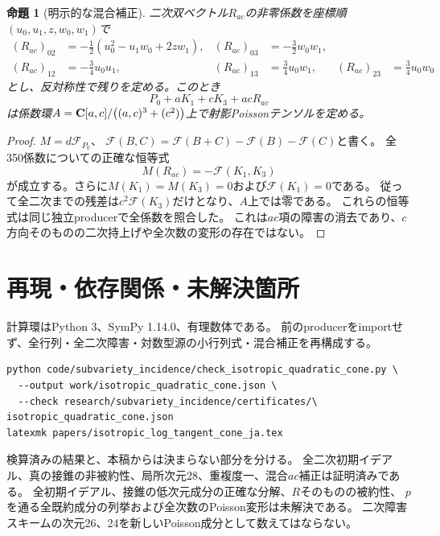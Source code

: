 \documentclass[a4paper,11pt]{ltjsarticle}
\newtheorem{proposition}[theorem]{命題}
\theoremstyle{remark}\newtheorem{remark}[theorem]{注意}
\begin{document}
\begin{proposition}[明示的な混合補正]\label{prop:mixed}
二次双ベクトル$R_{ac}$の非零係数を座標順$(u_0,u_1,z,w_0,w_1)$で
\[
\begin{aligned}
 (R_{ac})_{02}&=-\tfrac12(u_0^2-u_1w_0+2zw_1),&
 (R_{ac})_{03}&=-\tfrac32w_0w_1,\\
 (R_{ac})_{12}&=-\tfrac34u_0u_1,&
 (R_{ac})_{13}&=\tfrac34u_0w_1,&
 (R_{ac})_{23}&=\tfrac34u_0w_0
\end{aligned}
\]
とし、反対称性で残りを定める。このとき
\[
 P_0+aK_1+cK_3+acR_{ac}
\]
は係数環$A=\mathbf C[a,c]/\bigl((a,c)^3+(c^2)\bigr)$上で射影Poissonテンソルを定める。
\end{proposition}
\begin{proof}
$M=d\mathcal F_{P_0}$、
$\mathcal F(B,C)=\mathcal F(B+C)-\mathcal F(B)-\mathcal F(C)$と書く。
全350係数についての正確な恒等式
\[
 M(R_{ac})=-\mathcal F(K_1,K_3)
\]
が成立する。さらに$M(K_1)=M(K_3)=0$および$\mathcal F(K_1)=0$である。
従って全二次までの残差は$c^2\mathcal F(K_3)$だけとなり、$A$上では零である。
これらの恒等式は同じ独立producerで全係数を照合した。
これは$ac$項の障害の消去であり、$c$方向そのものの二次持上げや全次数の変形の存在ではない。
\end{proof}

\section{再現・依存関係・未解決箇所}
計算環はPython 3、SymPy 1.14.0、有理数体である。
前のproducerをimportせず、全行列・全二次障害・対数型源の小行列式・混合補正を再構成する。
\begin{verbatim}
python code/subvariety_incidence/check_isotropic_quadratic_cone.py \
  --output work/isotropic_quadratic_cone.json \
  --check research/subvariety_incidence/certificates/\
isotropic_quadratic_cone.json
latexmk papers/isotropic_log_tangent_cone_ja.tex
\end{verbatim}
検算済みの結果と、本稿からは決まらない部分を分ける。
全二次初期イデアル、真の接錐の非被約性、局所次元28、重複度一、混合$ac$補正は証明済みである。
全初期イデアル、接錐の低次元成分の正確な分解、$R$そのものの被約性、
$p$を通る全既約成分の列挙および全次数のPoisson変形は未解決である。
二次障害スキームの次元26、24を新しいPoisson成分として数えてはならない。
\end{document}
